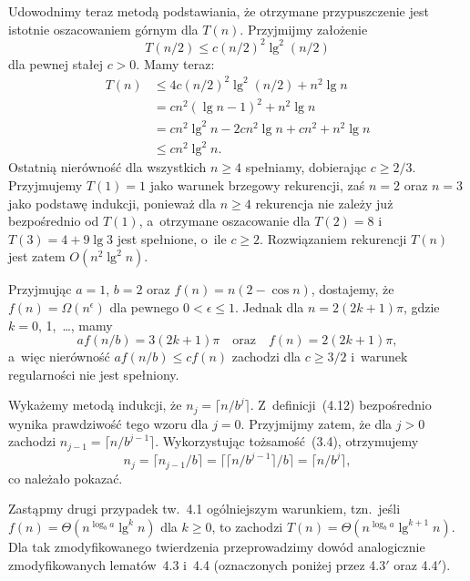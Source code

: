 Udowodnimy teraz metodą podstawiania, że otrzymane przypuszczenie jest istotnie oszacowaniem górnym dla $T(n)$. Przyjmijmy założenie
\[
	T(n/2) \le c(n/2)^2\lg^2(n/2)
\]
dla pewnej stałej $c>0$. Mamy teraz:
\begin{align*}
	T(n) &\le 4c(n/2)^2\lg^2(n/2)+n^2\lg n \\
	&= cn^2(\lg n-1)^2+n^2\lg n \\
	&= cn^2\lg^2n-2cn^2\lg n+cn^2+n^2\lg n \\
	&\le cn^2\lg^2n.
\end{align*}
Ostatnią nierówność dla wszystkich $n\ge4$ spełniamy, dobierając $c\ge2/3$. Przyjmujemy $T(1)=1$ jako warunek brzegowy rekurencji, zaś $n=2$ oraz $n=3$ jako podstawę indukcji, ponieważ dla $n\ge4$ rekurencja nie zależy już bezpośrednio od $T(1)$, a~otrzymane oszacowanie dla $T(2)=8$ i~$T(3)=4+9\lg3$ jest spełnione, o~ile $c\ge2$. Rozwiązaniem rekurencji $T(n)$ jest zatem $O(n^2\lg^2n)$.

\exercise %
Przyjmując $a=1$, $b=2$ oraz $f(n)=n(2-\cos n)$, dostajemy, że $f(n)=\Omega(n^\epsilon)$ dla pewnego $0<\epsilon\le1$. Jednak dla $n=2(2k+1)\pi$, gdzie $k=0$, 1,~\dots, mamy
\[
	af(n/b) = 3(2k+1)\pi \quad\text{oraz}\quad f(n) = 2(2k+1)\pi,
\]
a~więc nierówność $af(n/b)\le cf(n)$ zachodzi dla $c\ge3/2$ i~warunek regularności nie jest spełniony.


\exercise %
Wykażemy metodą indukcji, że $n_j=\bigl\lceil n/b^j\bigr\rceil$. Z~definicji~(4.12) bezpośrednio wynika prawdziwość tego wzoru dla $j=0$. Przyjmijmy zatem, że dla $j>0$ zachodzi $n_{j-1}=\bigl\lceil n/b^{j-1}\bigr\rceil$. Wykorzystując tożsamość~(3.4), otrzymujemy
\[
	n_j = \lceil n_{j-1}/b\rceil = \bigl\lceil\bigl\lceil n/b^{j-1}\bigr\rceil/b\bigr\rceil = \bigl\lceil n/b^j\bigr\rceil,
\]
co należało pokazać.

\exercise %
Zastąpmy drugi przypadek tw.~4.1 ogólniejszym warunkiem, tzn.\ jeśli $f(n)=\Theta(n^{\log_ba}\lg^kn)$ dla $k\ge0$, to zachodzi $T(n)=\Theta(n^{\log_ba}\lg^{k+1}n)$. Dla tak zmodyfikowanego twierdzenia przeprowadzimy dowód analogicznie zmodyfikowanych lematów~4.3 i~4.4 (oznaczonych poniżej przez 4.3$'$ oraz 4.4$'$).

